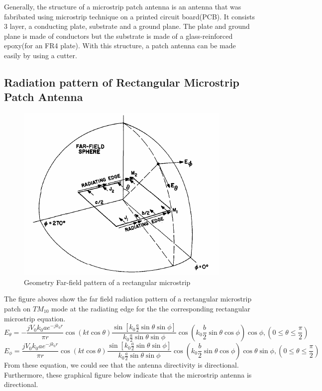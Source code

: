 \documentclass[11pt,a4paper,hidelinks]{article}
\begin{document}
      \indent Generally, the structure of a microstrip patch antenna is an antenna that was fabribated using
              microstrip technique on a printed circuit board(PCB)\cite{KFL:10}. It consists 3 layer, a conducting
              plate, substrate and a ground plane. The plate and ground plane is made of conductors but the
              substrate is made of a glass-reinforced epoxy(for an FR4 plate). With this structure, a patch antenna 
              can be made easily by using a cutter.
    
    \newpage

    \subsection{Radiation pattern of Rectangular Microstrip Patch Antenna}
      \begin{figure}[ht]
        \includegraphics{microstrip_rad.png}
        \centering
        \caption{Geometry Far-field pattern of a rectangular microstrip \cite{CaM:81}}
      \end{figure}
      \indent The figure aboves show the far field radiation pattern of a rectangular microstrip patch on $TM_{10}$ mode 
              at the radiating edge\cite{CaM:81} for the the corresponding rectangular microstrip equation.
      \begin{equation}
        E_{\theta} = - \frac{jV_0k_0ae^{-jk_0r}}{\pi r} \cos(kt\cos\theta) \frac{\sin[k_0 \frac{a}{2} \sin\theta\sin\phi]}{k_0 \frac{a}{2} \sin\theta\sin\phi}\cos(k_0\frac{b}{2}\sin{\theta}\cos{\phi})\cos{\phi}, (0 \leq \theta \leq \frac{\pi}{2})
      \end{equation}
      \begin{equation}
        E_{\phi} = \frac{jV_0k_0ae^{-jk_0r}}{\pi r} \cos(kt\cos\theta) \frac{\sin[k_0 \frac{a}{2} \sin\theta\sin\phi]}{k_0 \frac{a}{2} \sin\theta\sin\phi}\cos(k_0\frac{b}{2}\sin{\theta}\cos{\phi})\cos{\theta}\sin{\phi}, (0 \leq \theta \leq \frac{\pi}{2})
      \end{equation}
      \indent From these equation, we could see that the antenna directivity is directional.
              Furthermore, these graphical figure below indicate that the microstrip antenna is directional.
      
\end{document}
